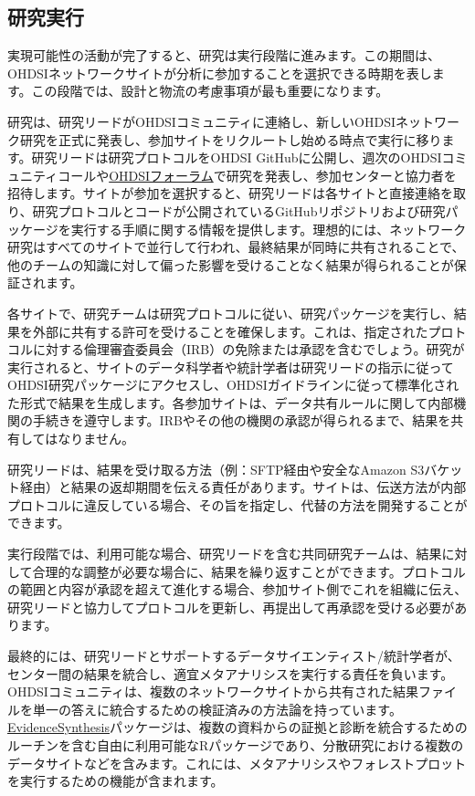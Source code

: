 \documentclass[
  11pt]{book}
\theoremstyle{definition}
\theoremstyle{definition}
\theoremstyle{definition}
\theoremstyle{definition}
\theoremstyle{remark}
\begin{document}
\subsection{研究実行}\label{ux7814ux7a76ux5b9fux884c}

実現可能性の活動が完了すると、研究は実行段階に進みます。この期間は、OHDSIネットワークサイトが分析に参加することを選択できる時期を表します。この段階では、設計と物流の考慮事項が最も重要になります。

研究は、研究リードがOHDSIコミュニティに連絡し、新しいOHDSIネットワーク研究を正式に発表し、参加サイトをリクルートし始める時点で実行に移ります。研究リードは研究プロトコルをOHDSI GitHubに公開し、週次のOHDSIコミュニティコールや\href{http://forums.ohdsi.org}{OHDSIフォーラム}で研究を発表し、参加センターと協力者を招待します。サイトが参加を選択すると、研究リードは各サイトと直接連絡を取り、研究プロトコルとコードが公開されているGitHubリポジトリおよび研究パッケージを実行する手順に関する情報を提供します。理想的には、ネットワーク研究はすべてのサイトで並行して行われ、最終結果が同時に共有されることで、他のチームの知識に対して偏った影響を受けることなく結果が得られることが保証されます。

各サイトで、研究チームは研究プロトコルに従い、研究パッケージを実行し、結果を外部に共有する許可を受けることを確保します。これは、指定されたプロトコルに対する倫理審査委員会（IRB）の免除または承認を含むでしょう。研究が実行されると、サイトのデータ科学者や統計学者は研究リードの指示に従ってOHDSI研究パッケージにアクセスし、OHDSIガイドラインに従って標準化された形式で結果を生成します。各参加サイトは、データ共有ルールに関して内部機関の手続きを遵守します。IRBやその他の機関の承認が得られるまで、結果を共有してはなりません。

研究リードは、結果を受け取る方法（例：SFTP経由や安全なAmazon S3バケット経由）と結果の返却期間を伝える責任があります。サイトは、伝送方法が内部プロトコルに違反している場合、その旨を指定し、代替の方法を開発することができます。

実行段階では、利用可能な場合、研究リードを含む共同研究チームは、結果に対して合理的な調整が必要な場合に、結果を繰り返すことができます。プロトコルの範囲と内容が承認を超えて進化する場合、参加サイト側でこれを組織に伝え、研究リードと協力してプロトコルを更新し、再提出して再承認を受ける必要があります。

最終的には、研究リードとサポートするデータサイエンティスト/統計学者が、センター間の結果を統合し、適宜メタアナリシスを実行する責任を負います。OHDSIコミュニティは、複数のネットワークサイトから共有された結果ファイルを単一の答えに統合するための検証済みの方法論を持っています。\href{https://github.com/OHDSI/EvidenceSynthesis}{EvidenceSynthesis}パッケージは、複数の資料からの証拠と診断を統合するためのルーチンを含む自由に利用可能なRパッケージであり、分散研究における複数のデータサイトなどを含みます。これには、メタアナリシスやフォレストプロットを実行するための機能が含まれます。
\end{document}
